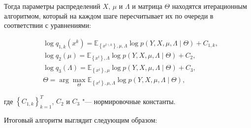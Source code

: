 Тогда параметры распределений $X$, $\mu$ и $\Lambda$ и матрица $\Theta$ находятся итерационным алгоритмом, который на каждом шаге пересчитывает их по очереди в соответствии с уравнениями:

\begin{align*}
	&\log{q_{1,k}\left(x^k\right)}=\mathbb{E}_{\left\{x^{t \backslash k}\right\},\mu,\Lambda}\log{p\left(Y,X,\mu,\Lambda\mid\Theta\right)}+C_{1,k}, \\
	&\log{q_2\left(\mu\right)}=\mathbb{E}_{\left\{x^t\right\},\Lambda}\log{p\left(Y,X,\mu,\Lambda\mid\Theta\right)}+C_2, \\
	&\log{q_3\left(\Lambda\right)}=\mathbb{E}_{\left\{x^t\right\},\mu}\log{p\left(Y,X,\mu,\Lambda\mid\Theta\right)}+C_3, \\
	&\Theta=\arg{\max_\Theta{\mathbb{E}_{\left\{x^t\right\},\mu,\Lambda}\log{p\left(Y,X,\mu,\Lambda\mid\Theta\right)}}},
\end{align*}

\noindent где $\left\{C_{1,k}\right\}_{k=1}^T$, $C_2$ и $C_3$ "--- нормировочные константы.

Итоговый алгоритм выглядит следующим образом:

